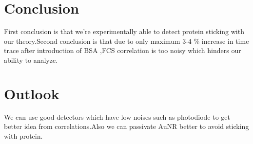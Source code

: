 \documentclass[twoside,single]{lion-msc}
\begin{document}
\section{Conclusion}
First conclusion is that we're experimentally able to detect protein sticking with our theory.Second conclusion is that due to only maximum 3-4 \% increase in time trace after introduction of BSA ,FCS correlation is too noisy which hinders our ability to analyze.
 
\section{Outlook}
We can use good detectors which have low noises such as photodiode to get better idea from correlations.Also we can passivate AuNR better to avoid sticking with protein.


\end{document}
